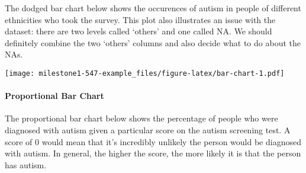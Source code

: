 \documentclass[]{article}
\newenvironment{Shaded}{\begin{snugshade}}{\end{snugshade}}
\newcommand{\CommentTok}[1]{\textcolor[rgb]{0.56,0.35,0.01}{\textit{#1}}}
\newcommand{\DataTypeTok}[1]{\textcolor[rgb]{0.13,0.29,0.53}{#1}}
\newcommand{\DecValTok}[1]{\textcolor[rgb]{0.00,0.00,0.81}{#1}}
\newcommand{\KeywordTok}[1]{\textcolor[rgb]{0.13,0.29,0.53}{\textbf{#1}}}
\newcommand{\NormalTok}[1]{#1}
\newcommand{\OperatorTok}[1]{\textcolor[rgb]{0.81,0.36,0.00}{\textbf{#1}}}
\newcommand{\StringTok}[1]{\textcolor[rgb]{0.31,0.60,0.02}{#1}}
\let\oldparagraph\paragraph
\renewcommand{\paragraph}[1]{\oldparagraph{#1}\mbox{}}
\begin{document}
The dodged bar chart below shows the occurences of autism in people of
different ethnicities who took the survey. This plot also illustrates an
issue with the dataset: there are two levels called `others' and one
called NA. We should definitely combine the two `others' columns and
also decide what to do about the NAs.

\begin{Shaded}
\end{Shaded}

\texttt{[image: milestone1-547-example\_files/figure-latex/bar-chart-1.pdf]}

\hypertarget{proportional-bar-chart}{%
\paragraph{Proportional Bar Chart}\label{proportional-bar-chart}}

The proportional bar chart below shows the percentage of people who were
diagnosed with autism given a particular score on the autism screening
test. A score of 0 would mean that it's incredibly unlikely the person
would be diagnosed with autism. In general, the higher the score, the
more likely it is that the person has autism.
\end{document}
